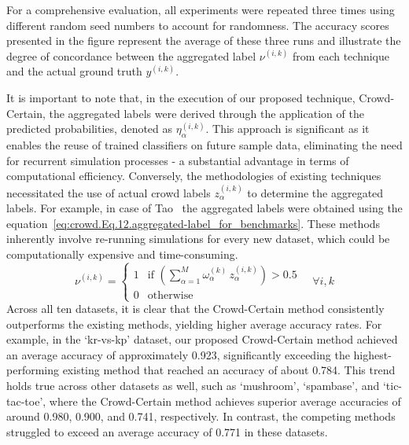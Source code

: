 For a comprehensive evaluation, all experiments were repeated three times using different random seed numbers to account for randomness. The accuracy scores presented in the figure represent the average of these three runs and illustrate the degree of concordance between the aggregated label $\nu^{(i,k)}$ from each technique and the actual ground truth $y^{(i,k)}$.

It is important to note that, in the execution of our proposed technique, Crowd-Certain, the aggregated labels were derived through the application of the predicted probabilities, denoted as $\eta_{\alpha}^{(i,k)}$. This approach is significant as it enables the reuse of trained classifiers on future sample data, eliminating the need for recurrent simulation processes - a substantial advantage in terms of computational efficiency. Conversely, the methodologies of existing techniques necessitated the use of actual crowd labels $z_\alpha^{(i,k)}$ to determine the aggregated labels. For example, in case of Tao~\cite{tao_Label_2020} the aggregated labels were obtained using the equation~\ref{eq:crowd.Eq.12.aggregated-label_for_benchmarks}. These methods inherently involve re-running simulations for every new dataset, which could be computationally expensive and time-consuming.
%
\begin{equation}
    \nu^{(i,k)} =
    \begin{cases}
        1 & \text{if } \left(\sum_{\alpha=1}^{M} \omega_{\alpha}^{(k)}\, z_{\alpha}^{(i,k)}\right) > 0.5 \\
        0 & \text{otherwise}
    \end{cases}
    \quad \forall i, k
    \label{eq:crowd.Eq.12.aggregated-label_for_benchmarks}
\end{equation}
%
Across all ten datasets, it is clear that the Crowd-Certain method consistently outperforms the existing methods, yielding higher average accuracy rates. For example, in the `kr-vs-kp' dataset, our proposed Crowd-Certain method achieved an average accuracy of approximately 0.923, significantly exceeding the highest-performing existing method that reached an accuracy of about 0.784. This trend holds true across other datasets as well, such as `mushroom', `spambase', and `tic-tac-toe', where the Crowd-Certain method achieves superior average accuracies of around 0.980, 0.900, and 0.741, respectively. In contrast, the competing methods struggled to exceed an average accuracy of 0.771 in these datasets.
%
